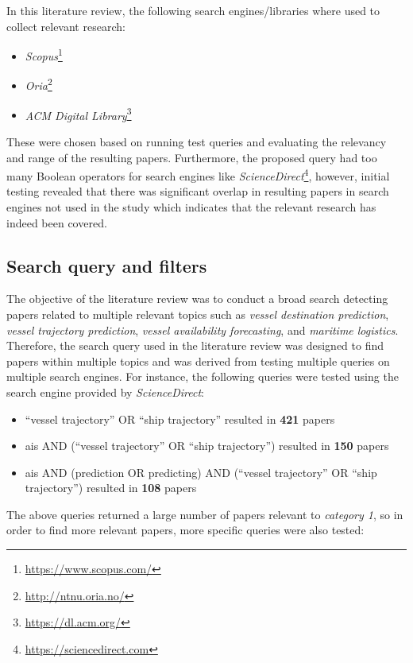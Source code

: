 In this literature review, the following search engines/libraries where used to collect relevant research:

\begin{itemize}
    \item \textit{Scopus}\footnote{\url{https://www.scopus.com/}}
    \item \textit{Oria}\footnote{\url{http://ntnu.oria.no/}}
    \item \textit{ACM Digital Library}\footnote{\url{https://dl.acm.org/}}
\end{itemize}

These were chosen based on running test queries and evaluating the relevancy and range of the resulting papers. Furthermore, the proposed query had too many Boolean operators for search engines like \textit{ScienceDirect}\footnote{\url{https://sciencedirect.com}}, however, initial testing revealed that there was significant overlap in resulting papers in search engines not used in the study which indicates that the relevant research has indeed been covered.

\subsection{Search query and filters}

The objective of the literature review was to conduct a broad search detecting papers related to multiple relevant topics such as \textit{vessel destination prediction}, \textit{vessel trajectory prediction}, \textit{vessel availability forecasting}, and \textit{maritime logistics}. Therefore, the search query used in the literature review was designed to find papers within multiple topics and was derived from testing multiple queries on multiple search engines. For instance, the following queries were tested using the search engine provided by \textit{ScienceDirect}:

\begin{itemize}
    \item ``vessel trajectory'' OR ``ship trajectory'' resulted in \textbf{421} papers
    \item ais AND (``vessel trajectory'' OR ``ship trajectory'') resulted in \textbf{150} papers
    \item ais AND (prediction OR predicting) AND (``vessel trajectory'' OR ``ship trajectory'') resulted in \textbf{108} papers
\end{itemize}

The above queries returned a large number of papers relevant to \textit{category 1}, so in order to find more relevant papers, more specific queries were also tested:

